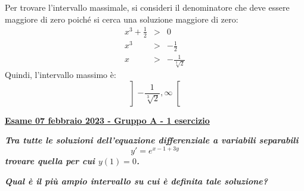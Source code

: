 \documentclass[a4paper]{article}
\newcommand{\definition}[1]{\textcolor{Red3}{\textbf{#1}}}
\newcommand{\example}[1]{\textcolor{Green4}{\textbf{#1}}}
\begin{document}
	Per trovare l'intervallo massimale, si consideri il denominatore che deve essere maggiore di zero poiché si cerca una soluzione maggiore di zero:
	\begin{equation*}
		\begin{array}{rcl}
			x^{3} + \frac{1}{2} &>& 0 \\ [.3em]
			x^{3} &>& -\frac{1}{2} \\ [.3em]
			x &>& -\frac{1}{\sqrt[3]{2}}
		\end{array}
	\end{equation*}
	Quindi, l'intervallo massimo è:
	\begin{equation*}
		\left] -\frac{1}{\sqrt[3]{2}}, \infty \right[
	\end{equation*}\newpage

	\begin{flushleft}
		\label{exam: esame 07 febbraio 2023 - Gruppo A - 1 esercizio}
		\hypertarget{
			exam: esame 07 febbraio 2023 - Gruppo A - 1 esercizio
		}{
			\definition{\underline{Esame 07 febbraio 2023 - Gruppo A - 1 esercizio}}
		}
	\end{flushleft}
	\example{\emph{Tra tutte le soluzioni dell'equazione differenziale a variabili separabili}
	\begin{equation*}
		y' = e^{x-1+3y}
	\end{equation*}
	\emph{trovare quella per cui $y\left(1\right) = 0$.}}

	\noindent
	\example{\emph{Qual è il più ampio intervallo su cui è definita tale soluzione?}}\newline
\end{document}
